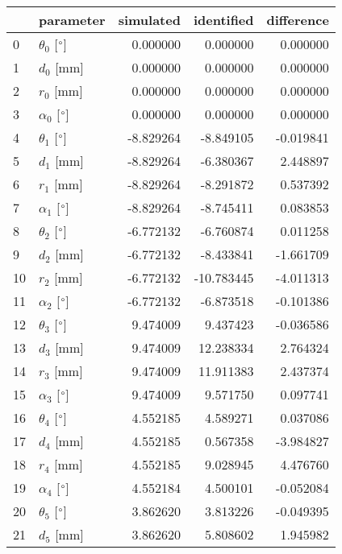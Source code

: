 \documentclass{standalone}%
\begin{document}
%
\normalsize%
\begin{tabular}{llrrr}
\toprule
{} &                 parameter & simulated & identified & difference \\
\midrule
0  &  $\theta_{0}$ [$\degree$] &  0.000000 &   0.000000 &   0.000000 \\
1  &              $d_{0}$ [mm] &  0.000000 &   0.000000 &   0.000000 \\
2  &              $r_{0}$ [mm] &  0.000000 &   0.000000 &   0.000000 \\
3  &  $\alpha_{0}$ [$\degree$] &  0.000000 &   0.000000 &   0.000000 \\
4  &  $\theta_{1}$ [$\degree$] & -8.829264 &  -8.849105 &  -0.019841 \\
5  &              $d_{1}$ [mm] & -8.829264 &  -6.380367 &   2.448897 \\
6  &              $r_{1}$ [mm] & -8.829264 &  -8.291872 &   0.537392 \\
7  &  $\alpha_{1}$ [$\degree$] & -8.829264 &  -8.745411 &   0.083853 \\
8  &  $\theta_{2}$ [$\degree$] & -6.772132 &  -6.760874 &   0.011258 \\
9  &              $d_{2}$ [mm] & -6.772132 &  -8.433841 &  -1.661709 \\
10 &              $r_{2}$ [mm] & -6.772132 & -10.783445 &  -4.011313 \\
11 &  $\alpha_{2}$ [$\degree$] & -6.772132 &  -6.873518 &  -0.101386 \\
12 &  $\theta_{3}$ [$\degree$] &  9.474009 &   9.437423 &  -0.036586 \\
13 &              $d_{3}$ [mm] &  9.474009 &  12.238334 &   2.764324 \\
14 &              $r_{3}$ [mm] &  9.474009 &  11.911383 &   2.437374 \\
15 &  $\alpha_{3}$ [$\degree$] &  9.474009 &   9.571750 &   0.097741 \\
16 &  $\theta_{4}$ [$\degree$] &  4.552185 &   4.589271 &   0.037086 \\
17 &              $d_{4}$ [mm] &  4.552185 &   0.567358 &  -3.984827 \\
18 &              $r_{4}$ [mm] &  4.552185 &   9.028945 &   4.476760 \\
19 &  $\alpha_{4}$ [$\degree$] &  4.552184 &   4.500101 &  -0.052084 \\
20 &  $\theta_{5}$ [$\degree$] &  3.862620 &   3.813226 &  -0.049395 \\
21 &              $d_{5}$ [mm] &  3.862620 &   5.808602 &   1.945982 \\

\end{tabular}
\end{document}
